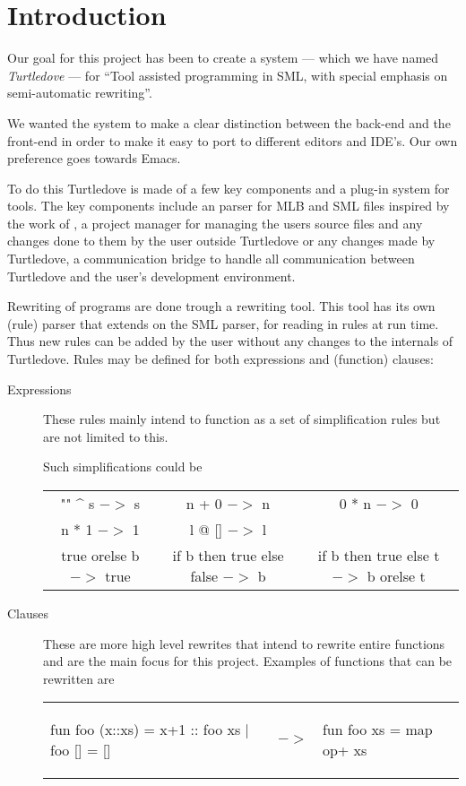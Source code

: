 \chapter{Introduction}
Our goal for this project has been to create a system --- which we have named
\textit{Turtledove} --- for ``Tool assisted programming in SML, with special
emphasis on semi-automatic rewriting''.

We wanted the system to make a clear distinction between the back-end and the
front-end in order to make it easy to port to different editors and IDE's. Our
own preference goes towards Emacs.

To do this Turtledove is made of a few key components and a plug-in system for
tools. The key components include an parser for MLB and SML files inspired by
the work of \cite{mbp08}, a project manager for managing the users source files
and any changes done to them by the user outside Turtledove or any changes made
by Turtledove, a communication bridge to handle all communication between
Turtledove and the user's development environment.

Rewriting of programs are done trough a rewriting tool. This tool has its own
(rule) parser that extends on the SML parser, for reading in rules at run
time. Thus new rules can be added by the user without any changes to the
internals of Turtledove. Rules may be defined for both expressions and
(function) clauses:

\begin{description}
\item[Expressions] These rules mainly intend to function as a set of
  simplification rules but are not limited to this. 

  Such simplifications could be 

  \begin{center}    
  \begin{tabular}{ccc}
    "" \^{} s $->$ s
    & n + 0 $->$ n
    & 0 * n $->$ 0
    \\
    n * 1 $->$ 1
    &l @ [] $->$ l
    &\\
    true orelse b $->$ true
    &if b then true else false $->$ b
    &if b then true else t $->$ b orelse t    
  \end{tabular}
  \end{center}

\item[Clauses] These are more high level rewrites that intend to rewrite entire
  functions and are the main focus for this project. Examples of functions that
  can be rewritten are 

\begin{minipage}{1.0\linewidth}
  \begin{tabular}{lcl}
\begin{sml}
fun foo (x::xs) = x+1 :: foo xs
  | foo []      = []     
\end{sml}
  & $->$ &
\begin{sml}
fun foo xs = map op+ xs      
\end{sml}
  \end{tabular}
\end{minipage}
\end{description}

